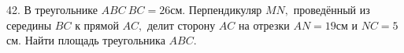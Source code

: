 42. В треугольнике $ABC\ BC=26$см. Перпендикуляр $MN,$ проведённый из середины $BC$ к прямой $AC,$ делит сторону $AC$ на отрезки $AN=19$см и $NC=5$см. Найти площадь треугольника $ABC.$\\
